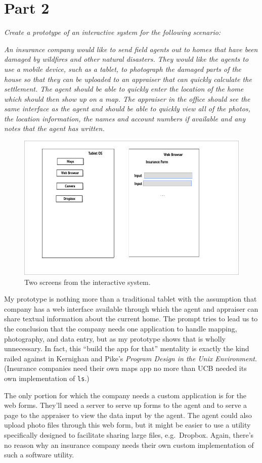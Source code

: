 \documentclass{abrice}
\begin{document}
\section{Part 2}

\emph{Create a prototype of an interactive system for the following scenario:}

\emph{An insurance company would like to send field agents out to homes that
  have been damaged by wildfires and other natural disasters. They would like
  the agents to use a mobile device, such as a tablet, to photograph the damaged
  parts of the house so that they can be uploaded to an appraiser that can
  quickly calculate the settlement. The agent should be able to quickly enter
  the location of the home which should then show up on a map. The appraiser in
  the office should see the same interface as the agent and should be able to
  quickly view all of the photos, the location information, the names and
  account numbers if available and any notes that the agent has written.}

\bigskip

\begin{figure}
  \includegraphics{foobar.jpg}
  \caption{Two screens from the interactive system.}
\end{figure}

\noindent
My prototype is nothing more than a traditional tablet with the assumption that
company has a web interface available through which the agent and appraiser can
share textual information about the current home. The prompt tries to lead us to
the conclusion that the company needs one application to handle mapping,
photography, and data entry, but as my prototype shows that is wholly
unnecessary. In fact, this ``build the app for that'' mentality is exactly the
kind railed against in Kernighan and Pike's \textit{Program Design in the Unix
  Environment}. (Insurance companies need their own maps app no more than UCB
needed its own implementation of \texttt{ls}.)

The only portion for which the company needs a custom application is for the web
forms. They'll need a server to serve up forms to the agent and to serve a page
to the appraiser to view the data input by the agent. The agent could also
upload photo files through this web form, but it might be easier to use a
utility specifically designed to facilitate sharing large files,
e.g.~Dropbox. Again, there's no reason why an insurance company needs their own
custom implementation of such a software utility.
\end{document}
